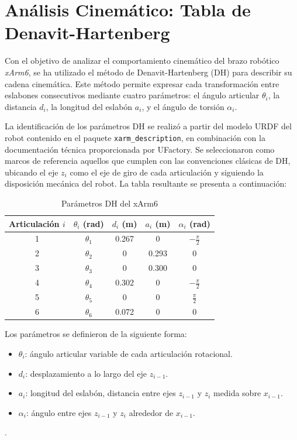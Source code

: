 \documentclass[conference]{IEEEtran}
\begin{document}
\section{Análisis Cinemático: Tabla de Denavit-Hartenberg}

Con el objetivo de analizar el comportamiento cinemático del brazo robótico \textit{xArm6}, se ha utilizado el método de Denavit-Hartenberg (DH) para describir su cadena cinemática. Este método permite expresar cada transformación entre eslabones consecutivos mediante cuatro parámetros: el ángulo articular $\theta_i$, la distancia $d_i$, la longitud del eslabón $a_i$, y el ángulo de torsión $\alpha_i$.

La identificación de los parámetros DH se realizó a partir del modelo URDF del robot contenido en el paquete \texttt{xarm\_description}, en combinación con la documentación técnica proporcionada por UFactory. Se seleccionaron como marcos de referencia aquellos que cumplen con las convenciones clásicas de DH, ubicando el eje $z_i$ como el eje de giro de cada articulación y siguiendo la disposición mecánica del robot. La tabla resultante se presenta a continuación:

\begin{table}[H]
\centering
\caption{Parámetros DH del xArm6}
\begin{tabular}{|c|c|c|c|c|}
\hline
\textbf{Articulación $i$} & $\theta_i$ (rad) & $d_i$ (m) & $a_i$ (m) & $\alpha_i$ (rad) \\
\hline
1 & $\theta_1$ & 0.267 & 0     & $-\frac{\pi}{2}$ \\
2 & $\theta_2$ & 0     & 0.293 & $0$              \\
3 & $\theta_3$ & 0     & 0.300 & $0$              \\
4 & $\theta_4$ & 0.302 & 0     & $-\frac{\pi}{2}$ \\
5 & $\theta_5$ & 0     & 0     & $\frac{\pi}{2}$  \\
6 & $\theta_6$ & 0.072 & 0     & $0$              \\
\hline
\end{tabular}
\label{tab:dh_xarm6}
\end{table}

Los parámetros se definieron de la siguiente forma:
\begin{itemize}
    \item $\theta_i$: ángulo articular variable de cada articulación rotacional.
    \item $d_i$: desplazamiento a lo largo del eje $z_{i-1}$.
    \item $a_i$: longitud del eslabón, distancia entre ejes $z_{i-1}$ y $z_i$ medida sobre $x_{i-1}$.
    \item $\alpha_i$: ángulo entre ejes $z_{i-1}$ y $z_i$ alrededor de $x_{i-1}$.
\end{itemize}.
\end{document}
